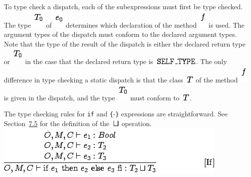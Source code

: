 \documentclass[]{article}
\begin{document}
To type check a dispatch, each of the subexpressions must first be type
checked. The type \includegraphics{img85.png} of
\includegraphics{img86.png} determines which declaration of the method
\includegraphics{img62.png} is used. The argument types of the dispatch
must conform to the declared argument types. Note that the type of the
result of the dispatch is either the declared return type or
\includegraphics{img85.png} in the case that the declared return type is
\includegraphics{img87.png}. The only difference in type checking a
static dispatch is that the class \includegraphics{img58.png} of the
method \includegraphics{img62.png} is given in the dispatch, and the
type \includegraphics{img85.png} must conform to
\includegraphics{img58.png}.

The type checking rules for \texttt{if} and \texttt{\{}-\texttt{\}}
expressions are straightforward. See
Section~\href{node18.html\#sec-cond}{7.5} for the definition of the
\includegraphics{img21.png} operation. \\

\includegraphics{img88.png}
\end{document}
